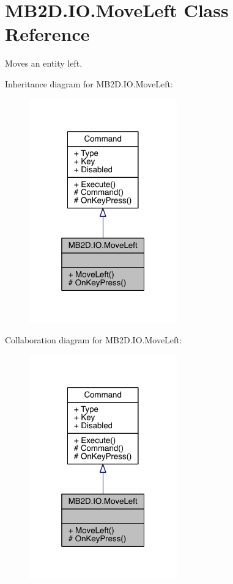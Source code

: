 \hypertarget{class_m_b2_d_1_1_i_o_1_1_move_left}{}\section{M\+B2\+D.\+I\+O.\+Move\+Left Class Reference}
\label{class_m_b2_d_1_1_i_o_1_1_move_left}


Moves an entity left.  




Inheritance diagram for M\+B2\+D.\+I\+O.\+Move\+Left\+:
\nopagebreak
\begin{figure}[H]
\begin{center}
\leavevmode
\includegraphics[width=181pt]{class_m_b2_d_1_1_i_o_1_1_move_left__inherit__graph}
\end{center}
\end{figure}


Collaboration diagram for M\+B2\+D.\+I\+O.\+Move\+Left\+:
\nopagebreak
\begin{figure}[H]
\begin{center}
\leavevmode
\includegraphics[width=181pt]{class_m_b2_d_1_1_i_o_1_1_move_left__coll__graph}
\end{center}
\end{figure}
